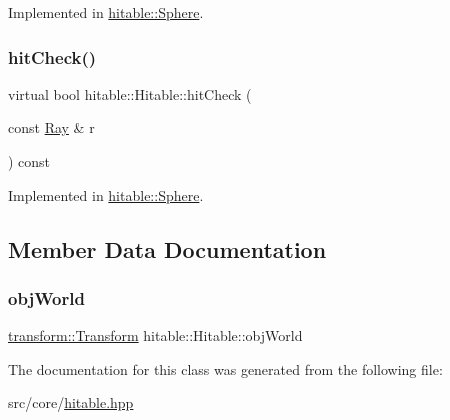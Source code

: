 Implemented in \mbox{\hyperlink{classhitable_1_1Sphere_ac8ff0fda7dc4914174c72ccc25728dba}{hitable\+::\+Sphere}}.

\mbox{\label{classhitable_1_1Hitable_a749b7d827cd624ab6eacc1ab93a53e64}} 
\subsubsection{\texorpdfstring{hitCheck()}{hitCheck()}}
{\footnotesize\ttfamily virtual bool hitable\+::\+Hitable\+::hit\+Check (\begin{DoxyParamCaption}\item[{const \mbox{\hyperlink{classRay}{Ray}} \&}]{r }\end{DoxyParamCaption}) const\hspace{0.3cm}{\ttfamily [pure virtual]}}



Implemented in \mbox{\hyperlink{classhitable_1_1Sphere_a83c88a65d5f727af1b69e98c9ac71fa0}{hitable\+::\+Sphere}}.



\subsection{Member Data Documentation}
\mbox{\label{classhitable_1_1Hitable_a53a8bbdc911d427245bcc7d34377d055}} 
\subsubsection{\texorpdfstring{objWorld}{objWorld}}
{\footnotesize\ttfamily \mbox{\hyperlink{classtransform_1_1Transform}{transform\+::\+Transform}} hitable\+::\+Hitable\+::obj\+World}



The documentation for this class was generated from the following file\+:\begin{DoxyCompactItemize}
\item 
src/core/\mbox{\hyperlink{hitable_8hpp}{hitable.\+hpp}}\end{DoxyCompactItemize}
